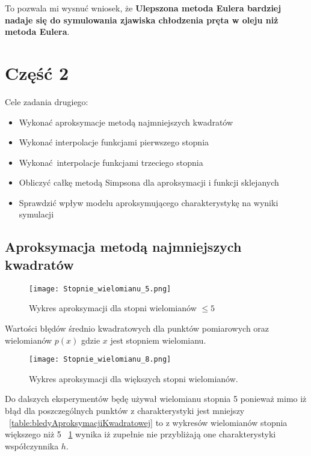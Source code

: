 \documentclass[varwidth,12pt,a4paper]{article}
\begin{document}
To pozwala mi wysnuć wniosek, że \textbf{Ulepszona metoda Eulera bardziej nadaje się do symulowania zjawiska chłodzenia
pręta w oleju niż metoda Eulera}.

\section{Część 2}

Cele zadania drugiego:

\begin{itemize}
  \item Wykonać aproksymacje metodą najmniejszych kwadratów
  \item Wykonać interpolacje funkcjami pierwszego stopnia
  \item Wykonać interpolacje funkcjami trzeciego stopnia
  \item Obliczyć całkę metodą Simpsona dla aproksymacji i funkcji sklejanych
  \item Sprawdzić wpływ modelu aproksymującego charakterystykę na wyniki symulacji
\end{itemize}

\subsection{Aproksymacja metodą najmniejszych kwadratów}

\begin{figure}[H]
    \texttt{[image: Stopnie\_wielomianu\_5.png]} 
    \caption{Wykres aproksymacji dla stopni wielomianów $\le 5$}
\end{figure}

\begin{table}[H]
    \centering{}
    \caption{Wartości błędów średnio kwadratowych dla punktów pomiarowych oraz wielomianów $p(x)$ gdzie $x$
    jest stopniem wielomianu.}
    \label{table:bledyAproksymacjiKwadratowej}
\end{table}

\begin{figure}[H]
    \texttt{[image: Stopnie\_wielomianu\_8.png]} 
    \caption{Wykres aproksymacji dla większych stopni wielomianów.}
    \label{fig:duzeStopnieWielomianow}
\end{figure}

Do dalszych eksperymentów będę używał wielomianu stopnia 5 ponieważ 
mimo iż błąd dla poszczególnych punktów z charakterystyki jest mniejszy ~\ref{table:bledyAproksymacjiKwadratowej} to 
z wykresów wielomianów stopnia większego niż 5 ~\ref{fig:duzeStopnieWielomianow} wynika iż zupełnie nie przybliżają
one charakterystyki współczynnika $h$.
\end{document}
